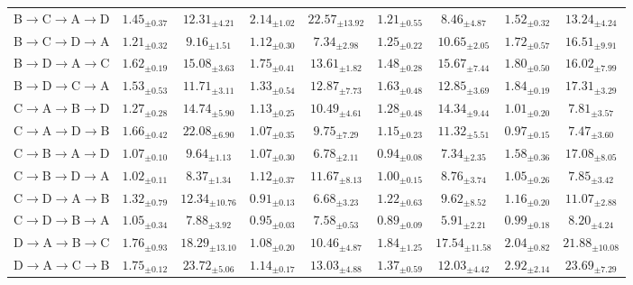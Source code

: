 \begin{table}[!t]
\begin{tabular*}{\textwidth}{@{\extracolsep{\fill}}lcccccccc}
B$\to$C$\to$A$\to$D & $1.45_{\pm0.37}$ & $12.31_{\pm4.21}$ & $2.14_{\pm1.02}$ & $22.57_{\pm13.92}$ & $1.21_{\pm0.55}$ & $8.46_{\pm4.87}$ & $1.52_{\pm0.32}$ & $13.24_{\pm4.24}$ \\
B$\to$C$\to$D$\to$A & $1.21_{\pm0.32}$ & $9.16_{\pm1.51}$ & $1.12_{\pm0.30}$ & $7.34_{\pm2.98}$ & $1.25_{\pm0.22}$ & $10.65_{\pm2.05}$ & $1.72_{\pm0.57}$ & $16.51_{\pm9.91}$ \\
B$\to$D$\to$A$\to$C & $1.62_{\pm0.19}$ & $15.08_{\pm3.63}$ & $1.75_{\pm0.41}$ & $13.61_{\pm1.82}$ & $1.48_{\pm0.28}$ & $15.67_{\pm7.44}$ & $1.80_{\pm0.50}$ & $16.02_{\pm7.99}$ \\
B$\to$D$\to$C$\to$A & $1.53_{\pm0.53}$ & $11.71_{\pm3.11}$ & $1.33_{\pm0.54}$ & $12.87_{\pm7.73}$ & $1.63_{\pm0.48}$ & $12.85_{\pm3.69}$ & $1.84_{\pm0.19}$ & $17.31_{\pm3.29}$ \\
C$\to$A$\to$B$\to$D & $1.27_{\pm0.28}$ & $14.74_{\pm5.90}$ & $1.13_{\pm0.25}$ & $10.49_{\pm4.61}$ & $1.28_{\pm0.48}$ & $14.34_{\pm9.44}$ & $1.01_{\pm0.20}$ & $7.81_{\pm3.57}$ \\
C$\to$A$\to$D$\to$B & $1.66_{\pm0.42}$ & $22.08_{\pm6.90}$ & $1.07_{\pm0.35}$ & $9.75_{\pm7.29}$ & $1.15_{\pm0.23}$ & $11.32_{\pm5.51}$ & $0.97_{\pm0.15}$ & $7.47_{\pm3.60}$ \\
C$\to$B$\to$A$\to$D & $1.07_{\pm0.10}$ & $9.64_{\pm1.13}$ & $1.07_{\pm0.30}$ & $6.78_{\pm2.11}$ & $0.94_{\pm0.08}$ & $7.34_{\pm2.35}$ & $1.58_{\pm0.36}$ & $17.08_{\pm8.05}$ \\
C$\to$B$\to$D$\to$A & $1.02_{\pm0.11}$ & $8.37_{\pm1.34}$ & $1.12_{\pm0.37}$ & $11.67_{\pm8.13}$ & $1.00_{\pm0.15}$ & $8.76_{\pm3.74}$ & $1.05_{\pm0.26}$ & $7.85_{\pm3.42}$ \\
C$\to$D$\to$A$\to$B & $1.32_{\pm0.79}$ & $12.34_{\pm10.76}$ & {\boldmath$0.91_{\pm0.13}$} & $6.68_{\pm3.23}$ & $1.22_{\pm0.63}$ & $9.62_{\pm8.52}$ & $1.16_{\pm0.20}$ & $11.07_{\pm2.88}$ \\
C$\to$D$\to$B$\to$A & $1.05_{\pm0.34}$ & $7.88_{\pm3.92}$ & $0.95_{\pm0.03}$ & $7.58_{\pm0.53}$ & $0.89_{\pm0.09}$ & {\boldmath$5.91_{\pm2.21}$} & $0.99_{\pm0.18}$ & $8.20_{\pm4.24}$ \\
D$\to$A$\to$B$\to$C & $1.76_{\pm0.93}$ & $18.29_{\pm13.10}$ & {\boldmath$1.08_{\pm0.20}$} & $10.46_{\pm4.87}$ & $1.84_{\pm1.25}$ & $17.54_{\pm11.58}$ & $2.04_{\pm0.82}$ & $21.88_{\pm10.08}$ \\
D$\to$A$\to$C$\to$B & $1.75_{\pm0.12}$ & $23.72_{\pm5.06}$ & $1.14_{\pm0.17}$ & $13.03_{\pm4.88}$ & $1.37_{\pm0.59}$ & $12.03_{\pm4.42}$ & $2.92_{\pm2.14}$ & $23.69_{\pm7.29}$ \\

\end{tabular*}
\end{table}
